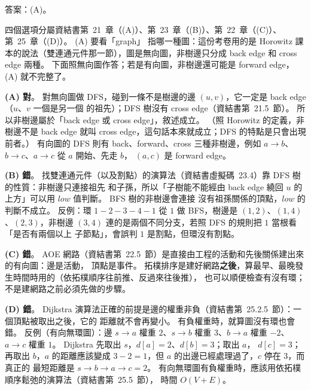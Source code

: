 \begin{pastsoln}
答案：(A)。

四個選項分屬資結書第~21~章（(A)）、第~23~章（(B)）、第~22~章（(C)）、第~25~章（(D)）。 (A) 要看「graph」
指哪一種圖：這份考卷用的是 Horowitz 課本的說法（雙連通元件那一節），圖是無向圖，非樹邊只分成 back edge
和 cross edge 兩種。 下面照無向圖作答；若是有向圖，非樹邊還可能是 forward edge，(A) 就不完整了。

\textbf{(A) 對}。 對無向圖做 DFS，碰到一條不是樹邊的邊 $(u, v)$，它一定是 back edge（$u$、$v$ 一個是另一個
的祖先）；DFS 樹沒有 cross edge（資結書第~21.5~節）。 所以非樹邊屬於「back edge 或 cross edge」，敘述成立。
（照 Horowitz 的定義，非樹邊不是 back edge 就叫 cross edge，這句話本來就成立；DFS 的特點是只會出現前者。）
有向圖的 DFS 則有 back、forward、cross 三種非樹邊，例如 $a \to b$、$b \to c$、$a \to c$ 從 $a$ 開始、先走 $b$，
$(a, c)$ 是 forward edge。

\textbf{(B) 錯}。 找雙連通元件（以及割點）的演算法（資結書虛擬碼~23.4）靠 DFS 樹的性質：非樹邊只連接祖先
和子孫，所以「子樹能不能經由 back edge 繞回 $u$ 的上方」可以用 $\mathit{low}$ 值判斷。 BFS 樹的非樹邊會連接
沒有祖孫關係的頂點，$\mathit{low}$ 的判斷不成立。 反例：環 $1\!-\!2\!-\!3\!-\!4\!-\!1$ 從 $1$ 做 BFS，樹邊是
$(1,2)$、$(1,4)$、$(2,3)$，非樹邊 $(3,4)$ 連的是兩個不同分支，若照 DFS 的規則把 $1$ 當根看「是否有兩個以上
子節點」，會誤判 $1$ 是割點，但環沒有割點。

\textbf{(C) 錯}。 AOE 網路（資結書第~22.5~節）是直接由工程的活動和先後關係建出來的有向圖：邊是活動，
頂點是事件。 拓樸排序是建好網路\textbf{之後}，算最早、最晚發生時間時用的（依拓樸順序往前推、反過來往後推），
也可以順便檢查有沒有環；不是建網路之前必須先做的步驟。

\textbf{(D) 錯}。 Dijkstra 演算法正確的前提是邊的權重非負（資結書第~25.2.5~節）：一個頂點被取出之後，它的
距離就不會再變小。 有負權重時，就算圖沒有環也會錯。 反例（有向無環圖）：邊 $s \to a$ 權重 $2$、$s \to b$
權重 $3$、$b \to a$ 權重 $-2$、$a \to c$ 權重 $1$。 Dijkstra 先取出 $s$，$d[a] = 2$、$d[b] = 3$；取出 $a$，
$d[c] = 3$；再取出 $b$，$a$ 的距離應該變成 $3 - 2 = 1$，但 $a$ 的出邊已經處理過了，$c$ 停在 $3$，而真正的
最短距離是 $s \to b \to a \to c = 2$。 有向無環圖有負權重時，應該用依拓樸順序鬆弛的演算法（資結書第~25.5~節），
時間 $O(V + E)$。
\end{pastsoln}
